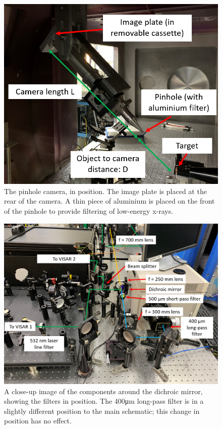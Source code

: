 \begin{figure}[!h]
\begin{centering}
\includegraphics[width=1.0\textwidth]{figures/AppendixExperiment/Pinhole.png}%
\caption{\label{fig:Appx-Pinhole} The pinhole camera, in position. The image plate is placed at the rear of the camera. A thin piece of aluminium is placed on the front of the pinhole to provide filtering of low-energy x-rays. }
\end{centering}
\end{figure}

\begin{figure}[!h]
\begin{centering}
\includegraphics[width=1.0\textwidth]{figures/AppendixExperiment/DichroicCloseUp.png}%
\caption{\label{fig:Appx-Dichroic} A close-up image of the components around the dichroic mirror, showing the filters in position. The 400\unit{\micro\meter} long-pass filter is in a slightly different position to the main schematic; this change in position has no effect.}
\end{centering}
\end{figure}

